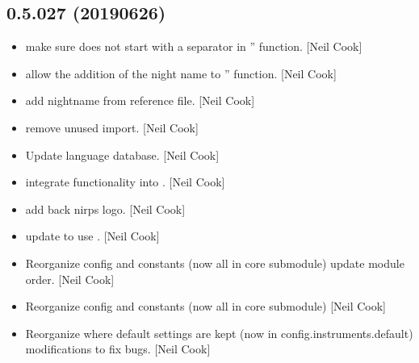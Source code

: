 \documentclass[a4paper,10pt,english]{report}
\begin{document}
\subsection{0.5.027 (2019\sphinxhyphen{}06\sphinxhyphen{}26)}
\label{\detokenize{misc/changelog:id128}}\begin{itemize}
\item {} 
 \sphinxhyphen{} make sure  does not start with a separator in
” function. {[}Neil Cook{]}

\item {} 
 \sphinxhyphen{} allow the addition of the night name to ”
function. {[}Neil Cook{]}

\item {} 
 \sphinxhyphen{} add nightname from reference file. {[}Neil
Cook{]}

\item {} 
 \sphinxhyphen{} remove unused import. {[}Neil Cook{]}

\item {} 
Update language database. {[}Neil Cook{]}

\item {} 
 \sphinxhyphen{} integrate  functionality into .
{[}Neil Cook{]}

\item {} 
 \sphinxhyphen{} add back nirps logo. {[}Neil Cook{]}

\item {} 
 \sphinxhyphen{} update  to use . {[}Neil
Cook{]}

\item {} 
Reorganize config and constants (now all in core sub\sphinxhyphen{}module) \sphinxhyphen{} update
module order. {[}Neil Cook{]}

\item {} 
Reorganize config and constants (now all in core sub\sphinxhyphen{}module) {[}Neil
Cook{]}

\item {} 
Reorganize where default settings are kept (now in
config.instruments.default) \textendash{} modifications to fix bugs. {[}Neil Cook{]}


\end{itemize}
\end{document}
